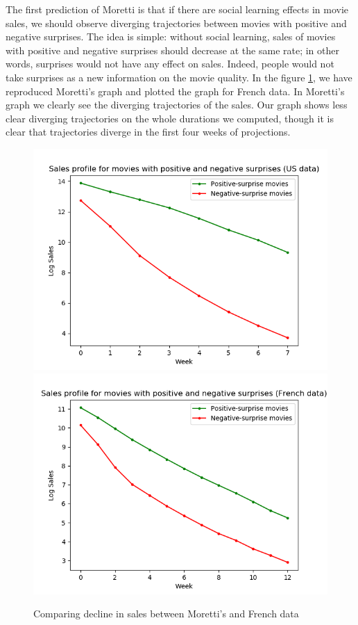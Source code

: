 The first prediction of Moretti is that if there are social learning effects in movie sales, we should observe diverging trajectories between movies with positive and negative surprises. The idea is simple: without social learning, sales of movies with positive and negative surprises should decrease at the same rate; in other words, surprises would not have any effect on sales. Indeed, people would not take surprises as a new information on the movie quality. In the figure \ref{part2.1_plot_moretti}, we have reproduced Moretti's graph and plotted the graph for French data. In Moretti's graph we clearly see the diverging trajectories of the sales. Our graph shows less clear diverging trajectories on the whole durations we computed, though it is clear that trajectories diverge in the first four weeks of projections.
\begin{figure}[H]\centering
	\caption{Comparing decline in sales between Moretti's and French data}
	\label{part2.1_plot_moretti}
	\includegraphics[scale=0.5]{sales_us.png}
	\includegraphics[scale=0.5]{sales_french.png}
\end{figure}
